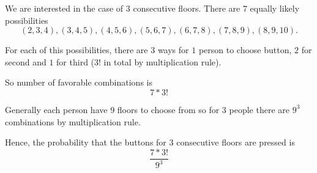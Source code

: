 We are interested in the case of $3$ consecutive floors. There are $7$ equally 
likely possibilities $$(2, 3, 4), (3, 4, 5), (4, 5, 6), (5, 6, 7), 
(6, 7, 8), (7, 8, 9), (8, 9, 10).$$

For each of this possibilities, there are $3$ ways for $1$ person to choose 
button, $2$ for second and $1$ for third ($3!$ in total by multiplication rule).

So number of favorable combinations is $$7 * 3!$$

Generally each person have $9$ floors to choose from so for $3$ people there are 
$9^3$ combinations by multiplication rule.

Hence, the probability that the buttons for $3$ consecutive floors are pressed
is $$\frac{7 * 3!}{9^3}$$